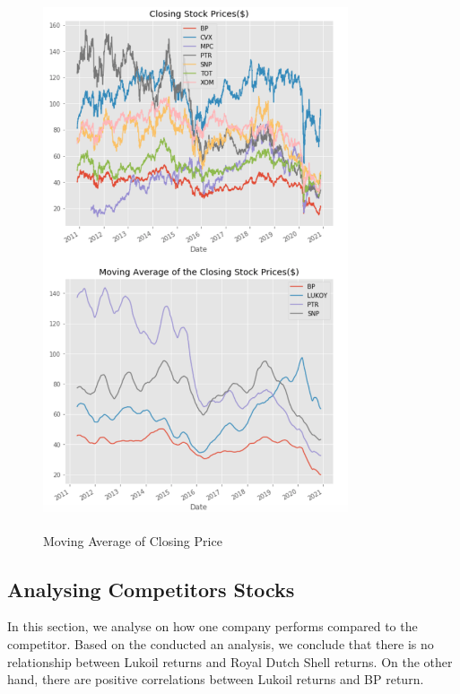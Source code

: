 \documentclass [a4paper, 11pt] {article}
\begin{document}
\begin{figure}[h]
\begin{center}
\caption{Moving Average of Closing Price}
\includegraphics[height=15cm]{Industry_MA}
\label{fig:ma2}
\end{center}
\end{figure}

\clearpage

\subsection {Analysing Competitors Stocks}
In this section, we analyse on how one company performs compared to the competitor.  Based on the conducted an analysis, we conclude that there is no relationship between Lukoil returns and Royal Dutch Shell returns. On the other hand, there are positive correlations between Lukoil returns and BP return.
\end{document}
